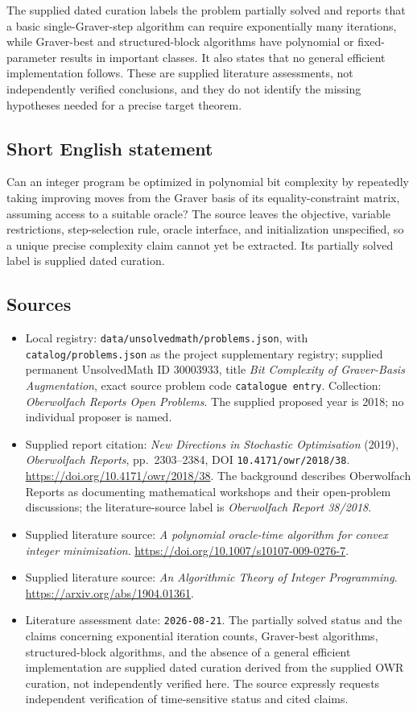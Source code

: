 \documentclass[11pt]{article}
\begin{document}
The supplied dated curation labels the problem partially solved and reports that a basic single-Graver-step algorithm can require exponentially many iterations, while Graver-best and structured-block algorithms have polynomial or fixed-parameter results in important classes. It also states that no general efficient implementation follows. These are supplied literature assessments, not independently verified conclusions, and they do not identify the missing hypotheses needed for a precise target theorem.
\subsection{Short English statement}
Can an integer program be optimized in polynomial bit complexity by repeatedly taking improving moves from the Graver basis of its equality-constraint matrix, assuming access to a suitable oracle? The source leaves the objective, variable restrictions, step-selection rule, oracle interface, and initialization unspecified, so a unique precise complexity claim cannot yet be extracted. Its partially solved label is supplied dated curation.
\subsection{Sources}
\begin{itemize}
\item Local registry: \texttt{data/unsolvedmath/problems.json}, with \texttt{catalog/problems.json} as the project supplementary registry; supplied permanent UnsolvedMath ID \(30003933\), title \emph{Bit Complexity of Graver-Basis Augmentation}, exact source problem code \texttt{catalogue entry}. Collection: \emph{Oberwolfach Reports Open Problems}. The supplied proposed year is 2018; no individual proposer is named.
\item Supplied report citation: \emph{New Directions in Stochastic Optimisation} (2019), \emph{Oberwolfach Reports}, pp.\ 2303--2384, DOI \texttt{10.4171/owr/2018/38}. \url{https://doi.org/10.4171/owr/2018/38}. The background describes Oberwolfach Reports as documenting mathematical workshops and their open-problem discussions; the literature-source label is \emph{Oberwolfach Report 38/2018}.
\item Supplied literature source: \emph{A polynomial oracle-time algorithm for convex integer minimization}. \url{https://doi.org/10.1007/s10107-009-0276-7}.
\item Supplied literature source: \emph{An Algorithmic Theory of Integer Programming}. \url{https://arxiv.org/abs/1904.01361}.
\item Literature assessment date: \texttt{2026-08-21}. The partially solved status and the claims concerning exponential iteration counts, Graver-best algorithms, structured-block algorithms, and the absence of a general efficient implementation are supplied dated curation derived from the supplied OWR curation, not independently verified here. The source expressly requests independent verification of time-sensitive status and cited claims.
\end{itemize}
\end{document}
